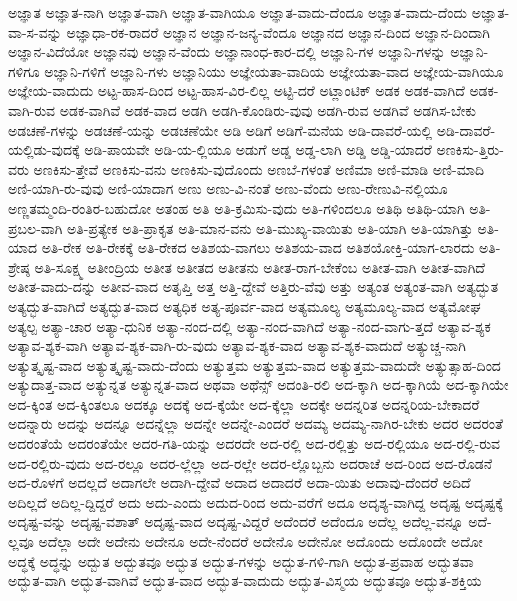 {ಅಜ್ಞಾತ
ಅಜ್ಞಾತ-ನಾಗಿ
ಅಜ್ಞಾತ-ವಾಗಿ
ಅಜ್ಞಾತ-ವಾಗಿಯೂ
ಅಜ್ಞಾತ-ವಾದು-ದೆಂದೂ
ಅಜ್ಞಾತ-ವಾದು-ದೆಂದು
ಅಜ್ಞಾತ-ವಾ-ಸ-ವನ್ನು
ಅಜ್ಞಾಧಾ-ರಕ-ರಾದರೆ
ಅಜ್ಞಾನ
ಅಜ್ಞಾನ-ಜನ್ಯ-ವೆಂದೂ
ಅಜ್ಞಾನದ
ಅಜ್ಞಾನ-ದಿಂದ
ಅಜ್ಞಾನ-ದಿಂದಾಗಿ
ಅಜ್ಞಾನ-ವಿದೆಯೋ
ಅಜ್ಞಾನವು
ಅಜ್ಞಾನ-ವೆಂದು
ಅಜ್ಞಾನಾಂಧ-ಕಾರ-ದಲ್ಲಿ
ಅಜ್ಞಾನಿ-ಗಳ
ಅಜ್ಞಾನಿ-ಗಳನ್ನು
ಅಜ್ಞಾನಿ-ಗಳಿಗೂ
ಅಜ್ಞಾನಿ-ಗಳಿಗೆ
ಅಜ್ಞಾನಿ-ಗಳು
ಅಜ್ಞಾನಿಯು
ಅಜ್ಞೇಯತಾ-ವಾದಿಯ
ಅಜ್ಞೇಯತಾ-ವಾದ
ಅಜ್ಞೇಯ-ವಾಗಿಯೂ
ಅಜ್ಞೇಯ-ವಾದುದು
ಅಟ್ಟ-ಹಾಸ-ದಿಂದ
ಅಟ್ಟ-ಹಾಸ-ವಿರ-ಲಿಲ್ಲ
ಅಟ್ಟಿ-ದರೆ
ಅಟ್ಲಾಂಟಿಕ್
ಅಡಕ
ಅಡಕ-ವಾಗಿದೆ
ಅಡಕ-ವಾಗಿ-ರುವ
ಅಡಕ-ವಾಗಿವೆ
ಅಡಕ-ವಾದ
ಅಡಗಿ
ಅಡಗಿ-ಕೊಂಡಿರು-ವುವು
ಅಡಗಿ-ರುವ
ಅಡಗಿವೆ
ಅಡಗಿಸ-ಬೇಕು
ಅಡಚಣೆ-ಗಳನ್ನು
ಅಡಚಣೆ-ಯನ್ನು
ಅಡಚಣೆಯೇ
ಅಡಿ
ಅಡಿಗೆ
ಅಡಿಗೆ-ಮನೆಯ
ಅಡಿ-ದಾವರೆ-ಯಲ್ಲಿ
ಅಡಿ-ದಾವರೆ-ಯಲ್ಲಿಡು-ವುದಕ್ಕೆ
ಅಡಿ-ಪಾಯವೇ
ಅಡಿ-ಯ-ಲ್ಲಿಯೂ
ಅಡುಗೆ
ಅಡ್ಡ
ಅಡ್ಡ-ಲಾಗಿ
ಅಡ್ಡಿ
ಅಡ್ಡಿ-ಯಾದರೆ
ಅಣಕಿಸು-ತ್ತಿರು-ವರು
ಅಣಕಿಸು-ತ್ತೇವೆ
ಅಣಕಿಸು-ವನು
ಅಣಕಿಸು-ವುದೊಂದು
ಅಣಬೆ-ಗಳಂತೆ
ಅಣಿಮಾ
ಅಣಿ-ಮಾಡಿ
ಅಣಿ-ಮಾದಿ
ಅಣಿ-ಯಾಗಿ-ರು-ವುವು
ಅಣಿ-ಯಾದಾಗ
ಅಣು
ಅಣು-ವಿ-ನಂತೆ
ಅಣು-ವೆಂದು
ಅಣು-ರೇಣುವಿ-ನಲ್ಲಿಯೂ
ಅಣ್ಣತಮ್ಮಂದಿ-ರಂತಿರ-ಬಹುದೋ
ಅತಂಹ
ಅತಿ
ಅತಿ-ಕ್ರಮಿಸು-ವುದು
ಅತಿ-ಗಳಿಂದಲೂ
ಅತಿಥಿ
ಅತಿಥಿ-ಯಾಗಿ
ಅತಿ-ಪ್ರಬಲ-ವಾಗಿ
ಅತಿ-ಪ್ರತ್ಯೇಕ
ಅತಿ-ಪ್ರಾಕೃತ
ಅತಿ-ಮಾನ-ವನು
ಅತಿ-ಮುಖ್ಯ-ವಾಯಿತು
ಅತಿ-ಯಾಗಿ
ಅತಿ-ಯಾಗಿತ್ತು
ಅತಿ-ಯಾದ
ಅತಿ-ರೇಕ
ಅತಿ-ರೇಕಕ್ಕೆ
ಅತಿ-ರೇಕದ
ಅತಿಶಯ-ವಾಗಲು
ಅತಿಶಯ-ವಾದ
ಅತಿಶಯೋಕ್ತಿ-ಯಾಗ-ಲಾರದು
ಅತಿ-ಶ್ರೇಷ್ಠ
ಅತಿ-ಸೂಕ್ಷ್ಮ
ಅತೀಂದ್ರಿಯ
ಅತೀತ
ಅತೀತದ
ಅತೀತನು
ಅತೀತ-ರಾಗ-ಬೇಕೆಂಬ
ಅತೀತ-ವಾಗಿ
ಅತೀತ-ವಾಗಿದೆ
ಅತೀತ-ವಾದು-ದನ್ನು
ಅತೀವ-ವಾದ
ಅತೃಪ್ತಿ
ಅತ್ತ
ಅತ್ತಿ-ದ್ದೇವೆ
ಅತ್ತಿರು-ವೆವು
ಅತ್ತು
ಅತ್ಯಂತ
ಅತ್ಯಂತ-ವಾಗಿ
ಅತ್ಯದ್ಭುತ
ಅತ್ಯದ್ಭುತ-ವಾಗಿದೆ
ಅತ್ಯದ್ಭುತ-ವಾದ
ಅತ್ಯಧಿಕ
ಅತ್ಯ-ಪೂರ್ವ-ವಾದ
ಅತ್ಯಮೂಲ್ಯ
ಅತ್ಯಮೂಲ್ಯ-ವಾದ
ಅತ್ಯಮೋಘ
ಅತ್ಯಲ್ಪ
ಅತ್ಯಾ-ಚಾರ
ಅತ್ಯಾ-ಧುನಿಕ
ಅತ್ಯಾ-ನಂದ-ದಲ್ಲಿ
ಅತ್ಯಾ-ನಂದ-ವಾಗಿದೆ
ಅತ್ಯಾ-ನಂದ-ವಾಗು-ತ್ತದೆ
ಅತ್ಯಾವ-ಶ್ಯಕ
ಅತ್ಯಾವ-ಶ್ಯಕ-ವಾಗಿ
ಅತ್ಯಾವ-ಶ್ಯಕ-ವಾಗಿ-ರು-ವುದು
ಅತ್ಯಾವ-ಶ್ಯಕ-ವಾದ
ಅತ್ಯಾವ-ಶ್ಯಕ-ವಾದುದೆ
ಅತ್ಯುಚ್ಚ-ನಾಗಿ
ಅತ್ಯುತ್ಕೃಷ್ಟ-ವಾದ
ಅತ್ಯುತ್ಕೃಷ್ಟ-ವಾದು-ದೆಂದು
ಅತ್ಯುತ್ತಮ
ಅತ್ಯುತ್ತಮ-ವಾದ
ಅತ್ಯುತ್ತಮ-ವಾದುದೇ
ಅತ್ಯುತ್ಸಾಹ-ದಿಂದ
ಅತ್ಯುದಾತ್ತ-ವಾದ
ಅತ್ಯುನ್ನತ
ಅತ್ಯುನ್ನತ-ವಾದ
ಅಥವಾ
ಅಥೆನ್ಸ್
ಅದಂತಿ-ರಲಿ
ಅದ-ಕ್ಕಾಗಿ
ಅದ-ಕ್ಕಾಗಿಯೆ
ಅದ-ಕ್ಕಾಗಿಯೇ
ಅದ-ಕ್ಕಿಂತ
ಅದ-ಕ್ಕಿಂತಲೂ
ಅದಕ್ಕೂ
ಅದಕ್ಕೆ
ಅದ-ಕ್ಕೆಯೇ
ಅದ-ಕ್ಕೆಲ್ಲಾ
ಅದಕ್ಕೇ
ಅದನ್ನರಿತ
ಅದನ್ನರಿಯ-ಬೇಕಾದರೆ
ಅದನ್ನಾರು
ಅದನ್ನು
ಅದನ್ನೂ
ಅದನ್ನೆಲ್ಲಾ
ಅದನ್ನೇ
ಅದನ್ನೇ-ಎಂದರೆ
ಅದಮ್ಯ
ಅದಮ್ಯ-ನಾಗಿರ-ಬೇಕು
ಅದರ
ಅದರಂತೆ
ಅದರಂತೆಯೆ
ಅದರಂತೆಯೇ
ಅದರ-ಗತಿ-ಯನ್ನು
ಅದರದೇ
ಅದ-ರಲ್ಲಿ
ಅದ-ರಲ್ಲಿತ್ತು
ಅದ-ರಲ್ಲಿಯೂ
ಅದ-ರಲ್ಲಿ-ರುವ
ಅದ-ರಲ್ಲಿರು-ವುದು
ಅದ-ರಲ್ಲೂ
ಅದರ-ಲ್ಲೆಲ್ಲಾ
ಅದ-ರಲ್ಲೇ
ಅದರ-ಲ್ಲೊಬ್ಬನು
ಅದರಾಚೆ
ಅದ-ರಿಂದ
ಅದ-ರೊಡನೆ
ಅದ-ರೊಳಗೆ
ಅದಲ್ಲದೆ
ಅದಾಗಲೇ
ಅದಾಗಿ-ದ್ದೇವೆ
ಅದಾದ
ಅದಾದರೆ
ಅದಾ-ಯಿತು
ಅದಾವು-ದೆಂದರೆ
ಅದಿದೆ
ಅದಿಲ್ಲದೆ
ಅದಿಲ್ಲ-ದ್ದಿದ್ದರೆ
ಅದು
ಅದು-ಎಂದು
ಅದುದ-ರಿಂದ
ಅದು-ವರೆಗೆ
ಅದೂ
ಅದೃಶ್ಯ-ವಾಗಿದ್ದ
ಅದೃಷ್ಟ
ಅದೃಷ್ಟಕ್ಕೆ
ಅದೃಷ್ಟ-ವನ್ನು
ಅದೃಷ್ಟ-ವಶಾತ್
ಅದೃಷ್ಟ-ವಾದ
ಅದೃಷ್ಟ-ವಿದ್ದರೆ
ಅದೆಂದರೆ
ಅದೆಂದೂ
ಅದೆಲ್ಲ
ಅದೆಲ್ಲ-ವನ್ನೂ
ಅದೆ-ಲ್ಲವೂ
ಅದೆಲ್ಲಾ
ಅದೇ
ಅದೇನು
ಅದೇನೂ
ಅದೇ-ನೆಂದರೆ
ಅದೇನೊ
ಅದೇನೋ
ಅದೊಂದು
ಅದೊಂದೇ
ಅದೋ
ಅದ್ಧಕ್ಕೆ
ಅದ್ಧನ್ನು
ಅದ್ಬುತ
ಅದ್ಬುತವೂ
ಅದ್ಭುತ
ಅದ್ಭುತ-ಗಳನ್ನು
ಅದ್ಭುತ-ಗಳಿ-ಗಾಗಿ
ಅದ್ಭುತ-ಪ್ರವಾಹ
ಅದ್ಭುತವಾ
ಅದ್ಭುತ-ವಾಗಿ
ಅದ್ಭುತ-ವಾಗಿವೆ
ಅದ್ಭುತ-ವಾದ
ಅದ್ಭುತ-ವಾದುದು
ಅದ್ಭುತ-ವಿಸ್ಮಯ
ಅದ್ಭುತವೂ
ಅದ್ಭುತ-ಶಕ್ತಿಯ
}

